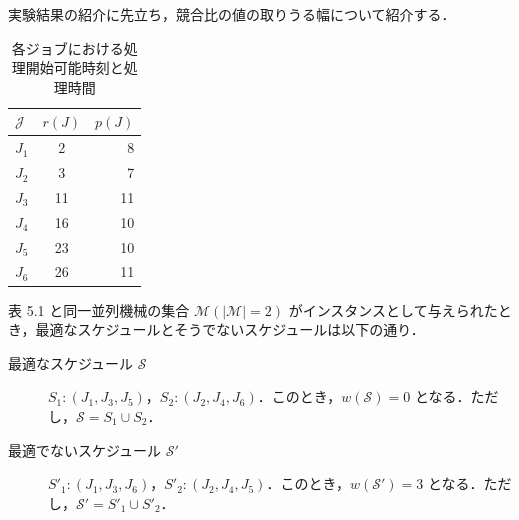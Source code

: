 \documentclass[12pt]{optlab-bachelor}
\begin{document}
実験結果の紹介に先立ち，競合比の値の取りうる幅について紹介する．
\begin{table}[htb]
  \begin{center}
    \begin{tabular}{|l|c|r|} \hline
      $\mathcal{J}$ & $r(J)$ & $p(J)$ \\ \hline \hline
      $J_1$ & 2 & 8 \\ \hline
      $J_2$ & 3 & 7 \\ \hline
      $J_3$ & 11 & 11 \\ \hline
      $J_4$ & 16 & 10 \\ \hline
      $J_5$ & 23 & 10 \\ \hline
      $J_6$ & 26 & 11 \\ \hline
    \end{tabular}
    \caption{各ジョブにおける処理開始可能時刻と処理時間}
  \end{center}
\end{table}

表 5.1 と同一並列機械の集合 $\mathcal{M} (|\mathcal{M}| = 2)$ がインスタンスとして与えられたとき，最適なスケジュールとそうでないスケジュールは以下の通り．
\begin{description}
  \item[最適なスケジュール $\mathcal{S}$] $S_1 : (J_1, J_3, J_5)$，$S_2 : (J_2, J_4, J_6)$．このとき，$w(\mathcal{S}) = 0$ となる．ただし，$\mathcal{S} = S_1 \cup S_2$．
  \item[最適でないスケジュール $\mathcal{S}'$] $S'_1 : (J_1, J_3, J_6)$，$S'_2 : (J_2, J_4, J_5)$．このとき，$w(\mathcal{S}') = 3$ となる．ただし，$\mathcal{S}' = S'_1 \cup S'_2$．
\end{description}
\end{document}
